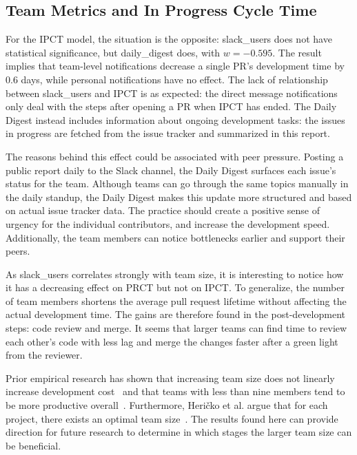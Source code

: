 \subsection{Team Metrics and In Progress Cycle Time}

For the IPCT model, the situation is the opposite: slack\_users does not have statistical significance, but daily\_digest does, with $w=-0.595$. The result implies that team-level notifications decrease a single PR's development time by 0.6 days, while personal notifications have no effect. The lack of relationship between slack\_users and IPCT is as expected: the direct message notifications only deal with the steps after opening a PR when IPCT has ended. The Daily Digest instead includes information about ongoing development tasks: the issues in progress are fetched from the issue tracker and summarized in this report. 

The reasons behind this effect could be associated with peer pressure. Posting a public report daily to the Slack channel, the Daily Digest surfaces each issue's status for the team. Although teams can go through the same topics manually in the daily standup, the Daily Digest makes this update more structured and based on actual issue tracker data. The practice should create a positive sense of urgency for the individual contributors, and increase the development speed. Additionally, the team members can notice bottlenecks earlier and support their peers. 

As slack\_users correlates strongly with team size, it is interesting to notice how it has a decreasing effect on PRCT but not on IPCT. To generalize, the number of team members shortens the average pull request lifetime without affecting the actual development time. The gains are therefore found in the post-development steps: code review and merge. It seems that larger teams can find time to review each other's code with less lag and merge the changes faster after a green light from the reviewer. 

Prior empirical research has shown that increasing team size does not linearly increase development cost~\cite{pendharkar_relationship_2009} and that teams with less than nine members tend to be more productive overall~\cite{rodriguez_empirical_2012}. Furthermore, Heričko et al. argue that for each project, there exists an optimal team size~\cite{hericko_approach_2008}. The results found here can provide direction for future research to determine in which stages the larger team size can be beneficial.

